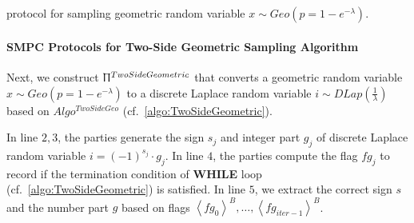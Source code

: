 \begin{protocol}[tbh!]
{{            \\
            \\
            }}
            \caption{\smpc protocol for sampling geometric random variable $x \sim Geo\left(p=1-e^{-\lambda}\right) $.}
            \label{prot:GeometricExpBinarySearch}
      \end{protocol}
      \FloatBarrier

      \paragraph{SMPC Protocols for Two-Side Geometric Sampling Algorithm}
      \label{para:MPCProtocolsforTwo-SideGeometricSamplingAlgorithm}

      Next, we construct $\Uppi^{TwoSideGeometric}$ that converts a geometric random variable $x\sim Geo\left(p=1-e^{-\lambda}\right)$ to a discrete Laplace random variable $i\sim DLap\left(\frac{1}{\lambda}\right) $ based on $Algo^{TwoSideGeo}$ (cf.~\autoref{algo:TwoSideGeometric}).

      In line $2,3$, the parties generate the sign $s_j$ and integer part $g_j$ of discrete Laplace random variable $i=\left(-1\right) ^{s_j}\cdot g_j$.
      In line $4$, the parties compute the flag $fg_j$ to record if the termination condition of \textbf{WHILE} loop (cf.~\autoref{algo:TwoSideGeometric}) is satisfied.
      In line $5$, we extract the correct sign $s$ and the number part $g$ based on flags $\left\langle fg_0\right\rangle ^B,\ldots ,\left\langle fg_{iter-1}\right\rangle ^B$.

